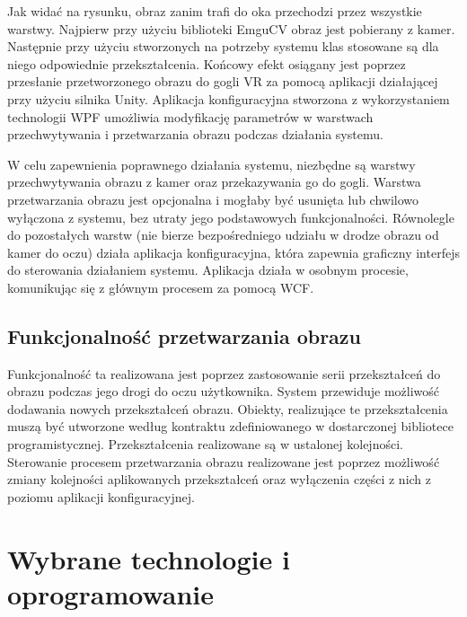 \documentclass[a4paper,11pt,twoside]{report}
\theoremstyle{definition}
\begin{document}
Jak widać na rysunku, obraz zanim trafi do oka przechodzi przez wszystkie warstwy. Najpierw przy użyciu biblioteki EmguCV obraz jest pobierany z kamer. Następnie przy użyciu stworzonych na potrzeby systemu klas stosowane są dla niego odpowiednie przekształcenia. Końcowy efekt osiągany jest poprzez przesłanie przetworzonego obrazu do gogli VR za pomocą aplikacji działającej przy użyciu silnika Unity. Aplikacja konfiguracyjna stworzona z wykorzystaniem technologii WPF umożliwia modyfikację parametrów w warstwach przechwytywania i przetwarzania obrazu podczas działania systemu. 

W celu zapewnienia poprawnego działania systemu, niezbędne są warstwy przechwytywania obrazu z kamer oraz przekazywania go do gogli. Warstwa przetwarzania obrazu jest opcjonalna i mogłaby być usunięta lub chwilowo wyłączona z systemu, bez utraty jego podstawowych funkcjonalności. Równolegle do pozostałych warstw (nie bierze bezpośredniego udziału w drodze obrazu od kamer do oczu) działa  aplikacja konfiguracyjna, która zapewnia graficzny interfejs do sterowania działaniem systemu. Aplikacja działa w osobnym procesie, komunikując się z głównym procesem za pomocą WCF.

\subsection{Funkcjonalność przetwarzania obrazu}
Funkcjonalność ta realizowana jest poprzez zastosowanie serii przekształceń do obrazu podczas jego drogi do oczu użytkownika. System przewiduje możliwość dodawania nowych przekształceń obrazu. Obiekty, realizujące te przekształcenia muszą być utworzone według kontraktu zdefiniowanego w dostarczonej bibliotece programistycznej. Przekształcenia realizowane są w ustalonej kolejności. Sterowanie procesem przetwarzania obrazu realizowane jest poprzez możliwość zmiany kolejności aplikowanych przekształceń oraz wyłączenia części z nich z poziomu aplikacji konfiguracyjnej.

\section{Wybrane technologie i oprogramowanie}
\end{document}
